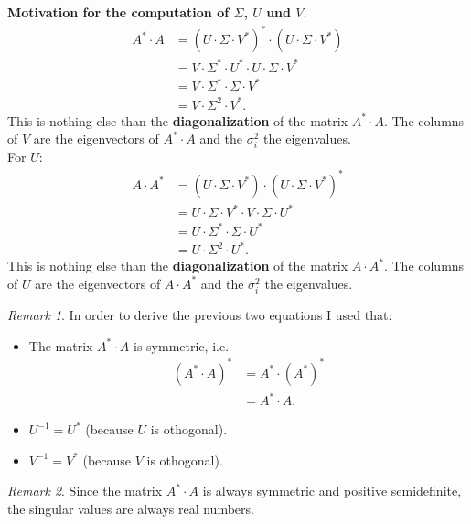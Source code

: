 \documentclass[a4paper,12 pt]{article}
\numberwithin{equation}{section}
\theoremstyle{definition}
\theoremstyle{remark}
\newtheorem*{bmk}{Remark}
\theoremstyle{definition}
\theoremstyle{definition}
\theoremstyle{definition}
\theoremstyle{remark}
\begin{document}
\textbf{Motivation for the computation of $\Sigma$, $U$ und $V$}.
\begin{equation}
\begin{split}
A^\ast\cdot A&=(U\cdot\Sigma\cdot V^\ast)^\ast\cdot(U\cdot\Sigma\cdot V^\ast)\\
&=V\cdot\Sigma^\ast\cdot U^\ast\cdot U\cdot\Sigma\cdot V^\ast\\
&=V\cdot\Sigma^\ast\cdot\Sigma\cdot V^\ast\\
&=V\cdot\Sigma^2\cdot V^\ast.
\end{split}
\end{equation}
This is nothing else than the \textbf{diagonalization} of the matrix $A^\ast\cdot A$. The columns of $V$ are the eigenvectors of $A^\ast\cdot A$ and the $\sigma_i^2$ the eigenvalues. \\ 
For $U$:
\begin{equation}
\begin{split}
A\cdot A^\ast &=(U\cdot\Sigma\cdot V^\ast)\cdot(U\cdot\Sigma\cdot V^\ast)^\ast\\
&=U\cdot\Sigma\cdot V^\ast\cdot V\cdot\Sigma\cdot U^\ast\\
&=U\cdot\Sigma^\ast\cdot\Sigma\cdot U^\ast\\
&=U\cdot\Sigma^2\cdot U^\ast.
\end{split}
\end{equation}
This is nothing else than the \textbf{diagonalization} of the matrix $A\cdot A^\ast$. The columns of $U$ are the eigenvectors of $A\cdot A^\ast$ and the $\sigma_i^2$ the eigenvalues. \\ 
\begin{bmk}
In order to derive the previous two equations I used that:
\begin{itemize}
\item The matrix $A^\ast\cdot A$ is symmetric, i.e.
\begin{equation*}
\begin{split}
(A^\ast\cdot A)^\ast &=A^\ast\cdot (A^\ast)^\ast\\
&=A^\ast \cdot A.
\end{split}
\end{equation*}
\item $U^{-1}=U^\ast$ (because $U$ is othogonal).
\item $V^{-1}=V^\ast$ (because $V$ is othogonal).
\end{itemize}
\end{bmk}
\begin{bmk}
Since the matrix $A^\ast\cdot A$ is always  symmetric and positive semidefinite, the singular values are always real numbers. 
\end{bmk}
\end{document}
